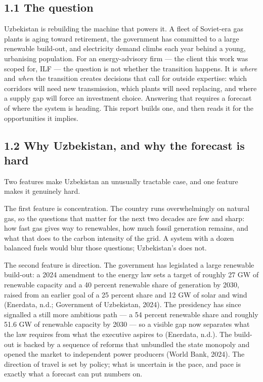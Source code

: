 \documentclass[10pt,twocolumn]{article}
\begin{document}
\subsection*{1.1 The question}

Uzbekistan is rebuilding the machine that powers it. A fleet of Soviet-era gas plants is aging toward retirement, the government has committed to a large renewable build-out, and electricity demand climbs each year behind a young, urbanising population. For an energy-advisory firm --- the client this work was scoped for, ILF --- the question is not whether the transition happens. It is \textit{where} and \textit{when} the transition creates decisions that call for outside expertise: which corridors will need new transmission, which plants will need replacing, and where a supply gap will force an investment choice. Answering that requires a forecast of where the system is heading. This report builds one, and then reads it for the opportunities it implies.

\subsection*{1.2 Why Uzbekistan, and why the forecast is hard}

Two features make Uzbekistan an unusually tractable case, and one feature makes it genuinely hard.

The first feature is concentration. The country runs overwhelmingly on natural gas, so the questions that matter for the next two decades are few and sharp: how fast gas gives way to renewables, how much fossil generation remains, and what that does to the carbon intensity of the grid. A system with a dozen balanced fuels would blur those questions; Uzbekistan's does not.

The second feature is direction. The government has legislated a large renewable build-out: a 2024 amendment to the energy law sets a target of roughly 27 GW of renewable capacity and a 40 percent renewable share of generation by 2030, raised from an earlier goal of a 25 percent share and 12 GW of solar and wind (Enerdata, n.d.; Government of Uzbekistan, 2024). The presidency has since signalled a still more ambitious path --- a 54 percent renewable share and roughly 51.6 GW of renewable capacity by 2030 --- so a visible gap now separates what the law requires from what the executive aspires to (Enerdata, n.d.). The build-out is backed by a sequence of reforms that unbundled the state monopoly and opened the market to independent power producers (World Bank, 2024). The direction of travel is set by policy; what is uncertain is the pace, and pace is exactly what a forecast can put numbers on.
\end{document}
